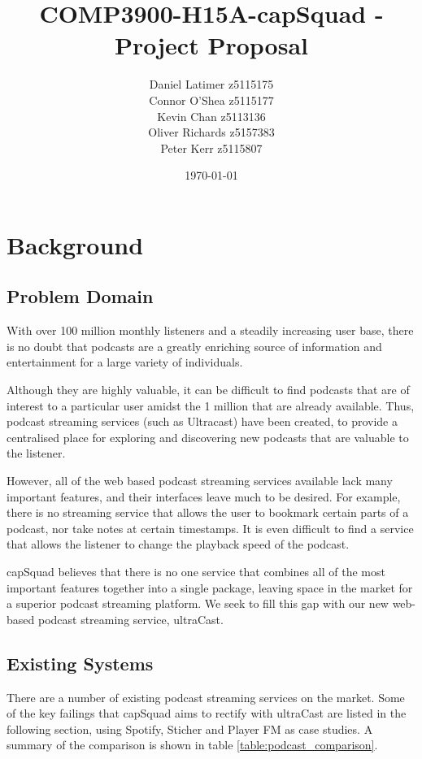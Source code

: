 \documentclass[12pt]{article}
\title{COMP3900-H15A-capSquad - Project Proposal}
\date{\today}
\author{Daniel Latimer z5115175 \\ Connor O'Shea z5115177 \\ Kevin Chan z5113136 \\ Oliver Richards z5157383 \\ Peter Kerr z5115807}
\begin{document}
\maketitle
\tableofcontents
\newpage

\section{Background}
\subsection{Problem Domain}
With over 100 million monthly listeners\cite{musicoomph} and a steadily increasing user base, there is no doubt that podcasts are a greatly enriching source of information and entertainment for a large variety of individuals.

Although they are highly valuable, it can be difficult to find podcasts that are of interest to a particular user amidst the 1 million\cite{musicoomph} that are already available.
Thus, podcast streaming services (such as Ultracast) have been created, to provide a centralised place for exploring and discovering new podcasts that are valuable to the listener.

However, all of the web based podcast streaming services available lack many important features, and their interfaces leave much to be desired. For example, there is no streaming service that allows the user to bookmark certain parts of a podcast, nor take notes at certain timestamps. It is even difficult to find a service that allows the listener to change the playback speed of the podcast.

capSquad believes that there is no one service that combines all of the most important features together into a single package, leaving space in the market for a superior podcast streaming platform. We seek to fill this gap with our new web-based podcast streaming service, ultraCast.

\subsection{Existing Systems}

There are a number of existing podcast streaming services on the market. Some of the key failings that capSquad aims to rectify with ultraCast are listed in the following section, using Spotify\cite{spotify}, Sticher\cite{sticher} and Player FM\cite{player_fm} as case studies.
A summary of the comparison is shown in table \ref{table:podcast_comparison}.
\end{document}
